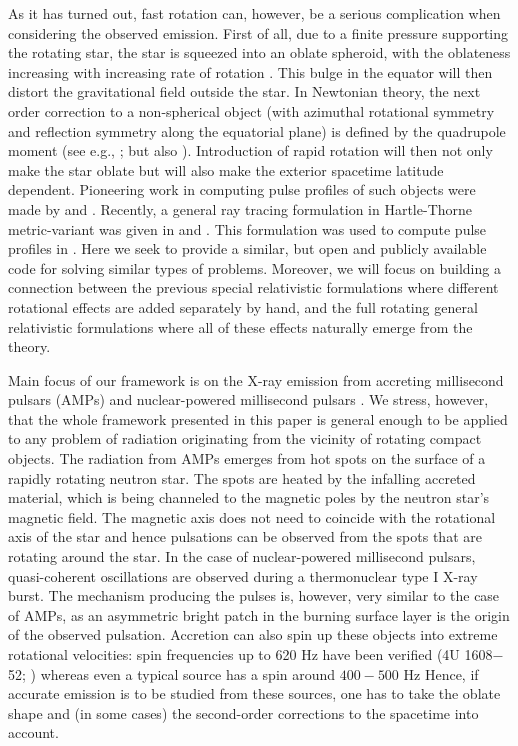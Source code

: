 \documentclass{aa}
\newcommand{\refe}[1]{#1}
\newcommand{\refedel}[1]{}
\begin{document}
As it has turned out, fast rotation can, however, be a serious complication when considering the observed emission.
First of all, due to a finite pressure supporting the rotating star, the star is squeezed into an oblate spheroid, with the oblateness increasing with increasing rate of rotation \citep{CST94, MS99, MLC07, BBP13, aGM14}.
This bulge in the equator will then distort the gravitational field outside the star.
In Newtonian theory, the next order correction to a non-spherical object (with azimuthal rotational symmetry and reflection symmetry along the equatorial plane) is defined by the quadrupole moment (see e.g., \citealt{LP99}; but also \citealt{PA12}).
Introduction of rapid rotation will then not only \refedel{break the spherical symmetry of the object} \refe{make the star oblate} but will also \refe{make the exterior spacetime latitude dependent.}
Pioneering work in computing pulse profiles of such objects were made by \citet{CL05} and \citet{CML07}.
Recently, a general ray tracing formulation in Hartle-Thorne metric-variant was given in \citet{PJ12} and \citet{BPO12}. 
This formulation was used to compute pulse profiles in \citet{PO14}.
Here we seek to provide a similar, but open and publicly available code for solving similar types of problems.
Moreover, we will focus on building a connection between the previous special relativistic formulations where different rotational effects are added separately by hand, and the full rotating general relativistic formulations where all of these effects naturally emerge from the theory.


Main focus of our framework is on the X-ray emission from accreting millisecond pulsars (AMPs) \citep{WvdK98, PW12} and nuclear-powered millisecond pulsars \citep{Watts12}.
We stress, however, that the whole framework presented in this paper is general enough to be applied to any problem of radiation originating from the vicinity of rotating compact objects. 
The radiation from AMPs emerges from hot spots on the surface of a rapidly rotating neutron star. The spots are heated by the infalling accreted material, which is being channeled to the magnetic poles by the neutron star's magnetic field.
The magnetic axis does not need to coincide with the rotational axis of the star and hence pulsations can be observed from the spots that are rotating around the star.
In the case of nuclear-powered millisecond pulsars, quasi-coherent oscillations are observed during a thermonuclear type I X-ray burst.
The mechanism producing the pulses is, however, very similar to the case of AMPs, as an asymmetric bright patch in the burning surface layer is the origin of the observed pulsation.
Accretion can also spin up these objects into extreme rotational velocities: spin frequencies up to 620 Hz have been verified (4U 1608$-$52; \citealt{MC02}) whereas even a typical source has a spin around $400-500$ Hz \citep{Watts12, PTR14}
Hence, if accurate emission is to be studied from these sources, one has to take the oblate shape and (in some cases) the second-order corrections to the spacetime into account.
\end{document}

